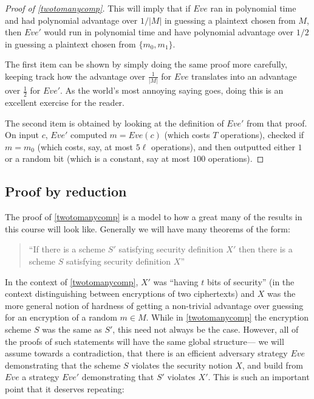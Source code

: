 \begin{proof}[Proof of \cref{twotomanycomp}]
This will imply that if \(Eve\) ran in polynomial time and had
polynomial advantage over \(1/|M|\) in guessing a plaintext chosen from
\(M\), then \(Eve'\) would run in polynomial time and have polynomial
advantage over \(1/2\) in guessing a plaintext chosen from
\(\{ m_0,m_1\}\).

The first item can be shown by simply doing the same proof more
carefully, keeping track how the advantage over \(\tfrac{1}{|M|}\) for
\(Eve\) translates into an advantage over \(\tfrac{1}{2}\) for \(Eve'\).
As the world's most annoying saying goes, doing this is an excellent
exercise for the reader.

The second item is obtained by looking at the definition of \(Eve'\)
from that proof. On input \(c\), \(Eve'\) computed \(m=Eve(c)\) (which
costs \(T\) operations), checked if \(m=m_0\) (which costs, say, at most
\(5\ell\) operations), and then outputted either \(1\) or a random bit
(which is a constant, say at most \(100\) operations).

\end{proof}

\subsection{Proof by reduction}\label{2-Proof-by-reduction}

The proof of \cref{twotomanycomp} is a model to how a great many of the
results in this course will look like. Generally we will have many
theorems of the form:

\begin{quote}
``If there is a scheme \(S'\) satisfying security definition \(X'\) then
there is a scheme \(S\) satisfying security definition \(X\)''
\end{quote}

In the context of \cref{twotomanycomp}, \(X'\) was ``having \(t\) bits
of security'' (in the context distinguishing between encryptions of two
ciphertexts) and \(X\) was the more general notion of hardness of
getting a non-trivial advantage over guessing for an encryption of a
random \(m\in M\). While in \cref{twotomanycomp} the encryption scheme
\(S\) was the same as \(S'\), this need not always be the case. However,
all of the proofs of such statements will have the same global
structure--- we will assume towards a contradiction, that there is an
efficient adversary strategy \(Eve\) demonstrating that the scheme \(S\)
violates the security notion \(X\), and build from \(Eve\) a strategy
\(Eve'\) demonstrating that \(S'\) violates \(X'\). This is such an
important point that it deserves repeating:

